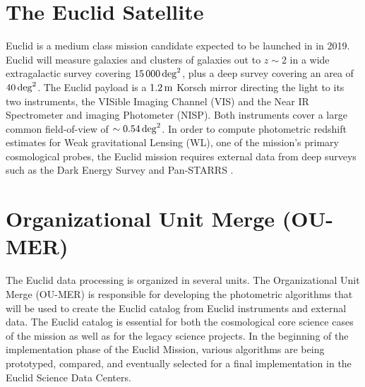 \section{The Euclid Satellite}
Euclid \citep{2011arXiv1110.3193L} is a medium class mission candidate expected to be launched in in 2019. Euclid will measure galaxies and clusters of galaxies out to $z\sim2$ in a wide extragalactic survey covering $15\,000\,\rm{deg}^2$, plus a deep survey covering an area of $40\,\rm{deg}^2$. The Euclid payload is a $1.2\,\rm{m}$ Korsch mirror directing the light to its two instruments, the VISible Imaging Channel (VIS) and the Near IR Spectrometer and imaging Photometer (NISP). Both instruments cover a large common field-of-view of $\sim0.54\,\rm{deg}^2$. In order to compute photometric redshift estimates for Weak gravitational Lensing (WL), one of the mission's primary cosmological probes, the Euclid mission requires external data from deep surveys such as the Dark Energy Survey \citep[DES]{2012APS..APR.D7007F} and Pan-STARRS \citep{2002SPIE.4836..154K}.

\section{Organizational Unit Merge (OU-MER)}
The Euclid data processing is organized in several units. The Organizational Unit Merge (OU-MER) is responsible for developing the photometric algorithms that will be used to create the Euclid catalog from Euclid instruments and external data. The Euclid catalog is essential for both the cosmological core science cases of the mission as well as for the legacy science projects. In the beginning of the implementation phase of the Euclid Mission, various algorithms are being prototyped, compared, and eventually selected for a final implementation in the Euclid Science Data Centers.

